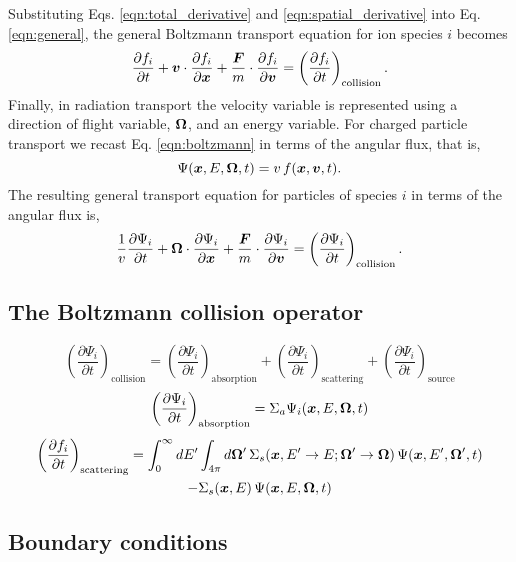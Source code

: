 Substituting Eqs. \eqref{eqn:total_derivative} and \eqref{eqn:spatial_derivative} into Eq. \eqref{eqn:general}, the general Boltzmann transport equation for ion species $i$ becomes
\begin{equation} \label{eqn:boltzmann}
  \dfrac{\partial f_i}{\partial t} + \Bv \cdot \dfrac{\partial f_i}{\partial \Bx} + \dfrac{\boldsymbol{F}}{m} \cdot \dfrac{\partial f_i}{\partial \Bv} = \left( \dfrac{\partial f_i}{\partial t} \right)_{\text{collision}}.
\end{equation}
Finally, in radiation transport the velocity variable is represented using a direction of flight variable, $\boldsymbol{\Omega}$, and an energy variable. For charged particle transport we recast Eq. \eqref{eqn:boltzmann} in terms of the angular flux, that is,
\begin{equation}
  \Psi(\boldsymbol{x},E,\boldsymbol{\Omega},t) = v \, f(\boldsymbol{x},\boldsymbol{v},t).
\end{equation}
The resulting general transport equation for particles of species $i$ in terms of the angular flux is,
\begin{equation}
  \dfrac{1}{v} \dfrac{\partial \Psi_i}{\partial t} + \boldsymbol{\Omega} \cdot \dfrac{\partial \Psi_i}{\partial \boldsymbol{x}} + \dfrac{\boldsymbol{F}}{m} \cdot \dfrac{\partial \Psi_i}{\partial \boldsymbol{v}} = \left( \dfrac{\partial \Psi_i}{\partial t} \right)_{\text{collision}}.
\end{equation} 


\subsection{The Boltzmann collision operator}
\begin{equation}
  \left( \dfrac{\partial \Psi_i}{\partial t} \right)_{\text{collision}} = \left( \dfrac{\partial \Psi_i}{\partial t} \right)_{\text{absorption}} + \left( \dfrac{\partial \Psi_i}{\partial t} \right)_{\text{scattering}} + \left( \dfrac{\partial \Psi_i}{\partial t} \right)_{\text{source}}
\end{equation}
\begin{equation}
  \left( \dfrac{\partial \Psi_i}{\partial t} \right)_{\text{absorption}} = \Sigma_a \Psi_i(\boldsymbol{x},E,\boldsymbol{\Omega},t)
\end{equation}
\begin{multline}
  \left( \dfrac{\partial f_i}{\partial t} \right)_{\text{scattering}} = \int_{0}^{\infty} dE^{\prime} \int_{4\pi} d \boldsymbol{\Omega}^{\prime} \, \Sigma_s(\boldsymbol{x}, E^{\prime}\rightarrow E; \boldsymbol{\Omega}^{\prime} \rightarrow \boldsymbol{\Omega}) \, \Psi(\boldsymbol{x},E^{\prime},\boldsymbol{\Omega}^{\prime},t) \\
  - \Sigma_s(\boldsymbol{x},E) \, \Psi(\boldsymbol{x},E,\boldsymbol{\Omega},t)
\end{multline}

\subsection{Boundary conditions}